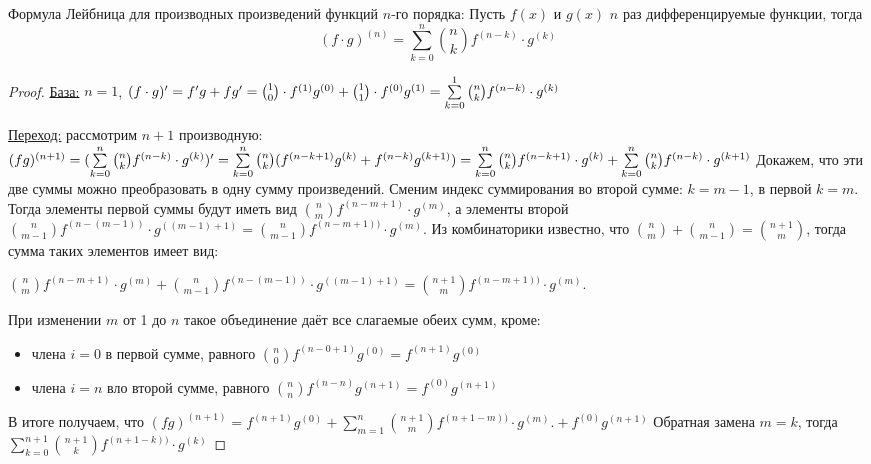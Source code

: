 \begin{definition}
Формула Лейбница для производных произведений функций $n$-го порядка:
    Пусть $f(x)$ и $g(x)$ \textemdash $n$ раз дифференцируемые функции,
    тогда
    $$
        (f\cdot g)^{(n)} = \sum\limits_{k=0}^{n} {n \choose k}
        f^{(n-k)}\cdot g^{(k)}
    $$
\end{definition}
\begin{proof}
    \underline{База:} $n=1$, $(f\cdot g)^{\prime} = f^{\prime} g + fg^{\prime} = {1
    \choose 0}\cdot f^{(1)}g^{(0)} + {1 \choose 1}\cdot f^{(0)}g^{(1)} =
    \sum\limits_{k=0}^{1} {n \choose k} f^{(n-k)}\cdot g^{(k)}$

    \underline{Переход:} рассмотрим $n+1$ производную:
    $(fg)^{(n+1)} =
    ( \sum\limits_{k=0}^{n} {n \choose k} f^{(n-k)}\cdot g^{(k)})^{\prime} =
    \sum\limits_{k=0}^{n} {n \choose
    k}(f^{(n-k+1)}g^{(k)}+f^{(n-k)}g^{(k+1)}) =
    \sum\limits_{k=0}^{n} {n \choose k} f^{(n-k+1)}\cdot g^{(k)}
    +
    \sum\limits_{k=0}^{n} {n \choose k} f^{(n-k)}\cdot g^{(k+1)}
    $
    Докажем, что эти две суммы можно преобразовать в одну сумму
    произведений. Сменим индекс суммирования во второй сумме: $k=m-1$, в
    первой $k=m$. Тогда элементы первой суммы будут иметь вид
    ${n \choose m} f^{(n-m+1)}\cdot g^{(m)}$, а элементы второй \textemdash
    ${n \choose m-1} f^{(n-(m-1))}\cdot g^{((m-1)+1)} =
    {n \choose m-1} f^{(n-m+1))}\cdot g^{(m)}.
    $
    Из комбинаторики известно, что ${n \choose m} + {n \choose m-1} = {n+1
    \choose m}$, тогда сумма таких элементов имеет вид:

    ${n \choose m} f^{(n-m+1)}\cdot g^{(m)} + {n \choose m-1}
    f^{(n-(m-1))}\cdot g^{((m-1)+1)} =
    {n+1 \choose m} f^{(n-m+1))}\cdot g^{(m)}.$

    При изменении $m$ от 1 до $n$ такое объединение даёт все слагаемые
    обеих сумм, кроме:
    \begin{itemize}
        \item члена $i = 0$ в первой сумме, равного ${n \choose
            0}f^{(n-0+1)}g^{(0)} = f^{(n+1)}g^{(0)}$
        \item члена $i = n$ вло второй сумме, равного ${n \choose
            n}f^{(n-n)}g^{(n+1)} = f^{(0)}g^{(n+1)}$
    \end{itemize}
    В итоге получаем, что $(fg)^{(n+1)} =
    f^{(n+1)}g^{(0)}
    +
    \sum\limits_{m=1}^{n}{n+1 \choose m}
    f^{(n+1-m))}\cdot g^{(m)}.
    +
    f^{(0)}g^{(n+1)}
    $
    Обратная замена $m=k$, тогда
    $
    \sum\limits_{k=0}^{n+1}{n+1 \choose k} f^{(n+1-k))}\cdot g^{(k)}
    $
\end{proof}
